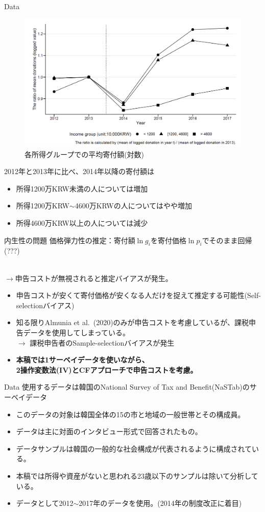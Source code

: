 \documentclass[dvipdfmx,10pt]{beamer}
\begin{document}
	\begin{frame}{Data}
		\begin{figure}
			\centering
			\includegraphics[width=0.7\linewidth]{Fig_Diff}
			\caption{各所得グループでの平均寄付額(対数)}
			\label{fig:3}
		\end{figure}
		\small
		2012年と2013年に比べ、2014年以降の寄付額は
		\begin{itemize}
			\item 所得1200万KRW未満の人については増加
			\item 所得1200万KRW$\sim$4600万KRWの人についてはやや増加
			\item 所得4600万KRW以上の人については減少
		\end{itemize}
	\end{frame}
	\begin{frame}{内生性の問題}
		価格弾力性の推定：寄付額$\ln g_i$を寄付価格$\ln p_i$でそのまま回帰(???)\\
		
		\
		
		$\to$申告コストが無視されると推定バイアスが発生。
			\begin{itemize}
				\item 申告コストが安くて寄付価格が安くなる人だけを捉えて推定する可能性(Self-selectionバイアス)
				\item 知る限りAlmunia et al.~(2020)のみが申告コストを考慮しているが、課税申告データを使用してしまっている。\\
				$\to$ 課税申告者のSample-selectionバイアスが発生
				\item\textbf{本稿では\ajMaru1サーベイデータを使いながら、\\\ajMaru2操作変数法(IV)とCFアプローチで申告コストを考慮。}
			\end{itemize}
	\end{frame}
	\begin{frame}{Data}
	使用するデータは韓国のNational Survey of Tax and Benefit(NaSTab)のサーベイデータ
	\begin{itemize}
		\item このデータの対象は韓国全体の15の市と地域の一般世帯とその構成員。
		\item データは主に対面のインタビュー形式で回答されたもの。
		\item データサンプルは韓国の一般的な社会構成が代表されるように構成されている。
		\item 本稿では所得や資産がないと思われる23歳以下のサンプルは除いて分析している。
		\item データとして2012$\sim$2017年のデータを使用。(2014年の制度改正に着目)
	\end{itemize}
\end{frame}
\end{document}
